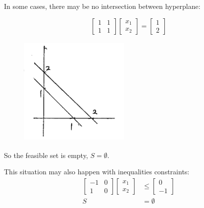 \begin{example}
	In some cases, there may be no intersection between hyperplane:
	
	\begin{equation*}
		\begin{bmatrix}
			1&1\\
			1&1
		\end{bmatrix}
		\begin{bmatrix}
			x_1\\
			x_2
		\end{bmatrix}=
		\begin{bmatrix}
			1\\
			2
		\end{bmatrix}
	\end{equation*}
	
	\begin{figure}
		\centering
		\includegraphics[width=2.1in,height=2.1in]{figures/ch07/figure1012_4.png}
	\end{figure}
	So the  feasible set is empty, $S = \emptyset$.
	
	\vspace{0.3cm}
	This situation may also happen with inequalities constraints:
	\begin{align*}
		\begin{bmatrix}
			-1&0\\
			1&0
		\end{bmatrix}
		\begin{bmatrix}
			x_1\\
			x_2
		\end{bmatrix}&\leq
		\begin{bmatrix}
			0\\
			-1
		\end{bmatrix}\\
		S &= \emptyset
	\end{align*}
	
\end{example}



